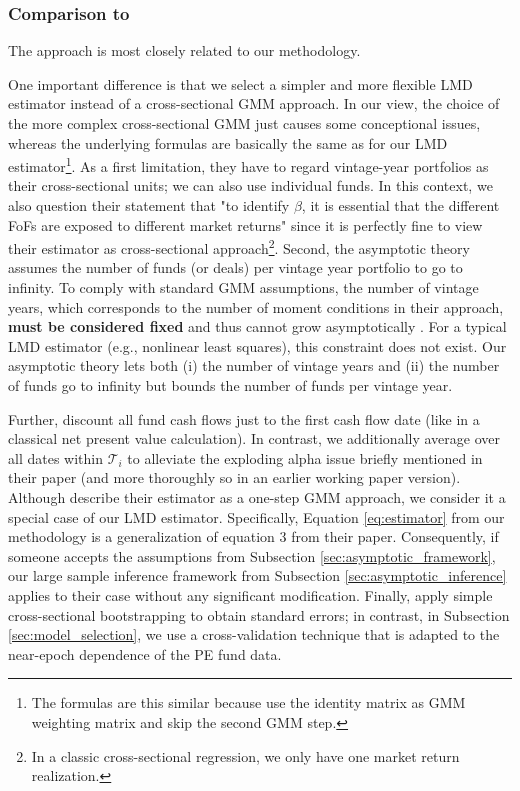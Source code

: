 \documentclass[12pt]{article}
\begin{document}
\subsubsection{Comparison to \cite{DLP12}}

The \cite{DLP12} approach is most closely related to our methodology.

One important difference is that we select a simpler and more flexible LMD estimator instead of a cross-sectional GMM approach.
In our view, the choice of the more complex cross-sectional GMM just causes some conceptional issues, whereas the underlying formulas are basically the same as for our LMD estimator\footnote{The formulas are this similar because \cite{DLP12} use the identity matrix as GMM weighting matrix and skip the second GMM step.}.
As a first limitation, they have to regard vintage-year portfolios as their cross-sectional units; we can also use individual funds.
In this context, we also question their statement that "to identify $\beta$, it is essential that the different FoFs are exposed to different market returns" since it is perfectly fine to view their estimator as cross-sectional approach\footnote{In a classic cross-sectional regression, we only have one market return realization.}.
Second, the \cite{DLP12} asymptotic theory assumes the number of funds (or deals) per vintage year portfolio to go to infinity.
To comply with standard GMM assumptions, the number of vintage years, which corresponds to the number of moment conditions in their approach, \textbf{must be considered fixed} and thus cannot grow asymptotically \citep{HP06,NW09}.
For a typical LMD estimator (e.g., nonlinear least squares), this constraint does not exist.
Our asymptotic theory lets both (i) the number of vintage years and (ii) the number of funds go to infinity but bounds the number of funds per vintage year.

Further, \cite{DLP12} discount all fund cash flows just to the first cash flow date (like in a classical net present value calculation).
In contrast, we additionally average over all dates within $\mathcal{T}_{i}$ to alleviate the exploding alpha issue briefly mentioned in their paper (and more thoroughly so in an earlier working paper version).
Although \cite{DLP12} describe their estimator as a one-step GMM approach, we consider it a special case of our LMD estimator.
Specifically, Equation \ref{eq:estimator} from our methodology is a generalization of equation 3 from their paper.
Consequently, if someone accepts the assumptions from Subsection \ref{sec:asymptotic_framework}, our large sample inference framework from Subsection \ref{sec:asymptotic_inference} applies to their case without any significant modification.
Finally, \cite{DLP12} apply simple cross-sectional bootstrapping to obtain standard errors; in contrast, in Subsection \ref{sec:model_selection}, we use a cross-validation technique that is adapted to the near-epoch dependence of the PE fund data.
\end{document}
